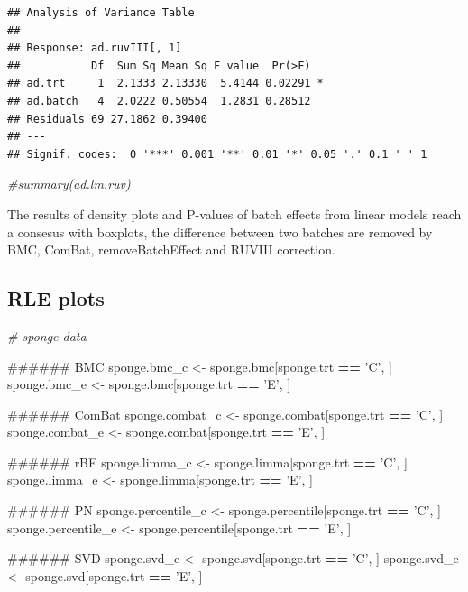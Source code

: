 \documentclass[]{book}
\newenvironment{Shaded}{\begin{snugshade}}{\end{snugshade}}
\newcommand{\StringTok}[1]{\textcolor[rgb]{0.31,0.60,0.02}{#1}}
\newcommand{\CommentTok}[1]{\textcolor[rgb]{0.56,0.35,0.01}{\textit{#1}}}
\newcommand{\OperatorTok}[1]{\textcolor[rgb]{0.81,0.36,0.00}{\textbf{#1}}}
\newcommand{\NormalTok}[1]{#1}
\begin{document}
\begin{verbatim}
## Analysis of Variance Table
## 
## Response: ad.ruvIII[, 1]
##           Df  Sum Sq Mean Sq F value  Pr(>F)  
## ad.trt     1  2.1333 2.13330  5.4144 0.02291 *
## ad.batch   4  2.0222 0.50554  1.2831 0.28512  
## Residuals 69 27.1862 0.39400                  
## ---
## Signif. codes:  0 '***' 0.001 '**' 0.01 '*' 0.05 '.' 0.1 ' ' 1
\end{verbatim}

\begin{Shaded}
\begin{Highlighting}[]
\CommentTok{#summary(ad.lm.ruv)}
\end{Highlighting}
\end{Shaded}

The results of density plots and P-values of batch effects from linear
models reach a consesus with boxplots, the difference between two
batches are removed by BMC, ComBat, removeBatchEffect and RUVIII
correction.

\subsection{RLE plots}\label{rle-plots-1}

\begin{Shaded}
\begin{Highlighting}[]
\CommentTok{# sponge data}

\NormalTok{###### BMC}
\NormalTok{sponge.bmc_c <-}\StringTok{ }\NormalTok{sponge.bmc[sponge.trt }\OperatorTok{==}\StringTok{ 'C'}\NormalTok{, ]}
\NormalTok{sponge.bmc_e <-}\StringTok{ }\NormalTok{sponge.bmc[sponge.trt }\OperatorTok{==}\StringTok{ 'E'}\NormalTok{, ] }

\NormalTok{###### ComBat}
\NormalTok{sponge.combat_c <-}\StringTok{ }\NormalTok{sponge.combat[sponge.trt }\OperatorTok{==}\StringTok{ 'C'}\NormalTok{, ]}
\NormalTok{sponge.combat_e <-}\StringTok{ }\NormalTok{sponge.combat[sponge.trt }\OperatorTok{==}\StringTok{ 'E'}\NormalTok{, ] }

\NormalTok{###### rBE}
\NormalTok{sponge.limma_c <-}\StringTok{ }\NormalTok{sponge.limma[sponge.trt }\OperatorTok{==}\StringTok{ 'C'}\NormalTok{, ]}
\NormalTok{sponge.limma_e <-}\StringTok{ }\NormalTok{sponge.limma[sponge.trt }\OperatorTok{==}\StringTok{ 'E'}\NormalTok{, ] }

\NormalTok{###### PN}
\NormalTok{sponge.percentile_c <-}\StringTok{ }\NormalTok{sponge.percentile[sponge.trt }\OperatorTok{==}\StringTok{ 'C'}\NormalTok{, ]}
\NormalTok{sponge.percentile_e <-}\StringTok{ }\NormalTok{sponge.percentile[sponge.trt }\OperatorTok{==}\StringTok{ 'E'}\NormalTok{, ] }

\NormalTok{###### SVD}
\NormalTok{sponge.svd_c <-}\StringTok{ }\NormalTok{sponge.svd[sponge.trt }\OperatorTok{==}\StringTok{ 'C'}\NormalTok{, ]}
\NormalTok{sponge.svd_e <-}\StringTok{ }\NormalTok{sponge.svd[sponge.trt }\OperatorTok{==}\StringTok{ 'E'}\NormalTok{, ] }
\end{Highlighting}
\end{Shaded}
\end{document}
